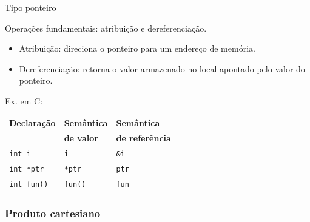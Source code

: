 \documentclass[handout]{beamer}
\begin{document}
\begin{frame}[fragile]{Tipo ponteiro}
\begin{itemize}
    \item Operações fundamentais: atribuição e dereferenciação.
    \begin{itemize}
        \item Atribuição: direciona o ponteiro para um endereço de memória.
        \item Dereferenciação: retorna o valor armazenado no local apontado pelo valor do ponteiro.
    \end{itemize}
\begin{center}
    \item Ex. em C:

\begin{tabular}{lll}
    \hline
    \textbf{Declaração} & \textbf{Semântica} & \textbf{Semântica} \\
     & \textbf{de valor} & \textbf{de referência} \\ \hline
     \lstinline|int i| & \lstinline|i| & \lstinline|&i| \\
     \lstinline|int *ptr| & \lstinline|*ptr| & \lstinline|ptr| \\
     \lstinline|int fun()| & \lstinline|fun()| & \lstinline|fun| \\
     \hline
\end{tabular}
\end{center}

\end{itemize}


\end{frame}


\subsubsection{Produto cartesiano}
\end{document}
